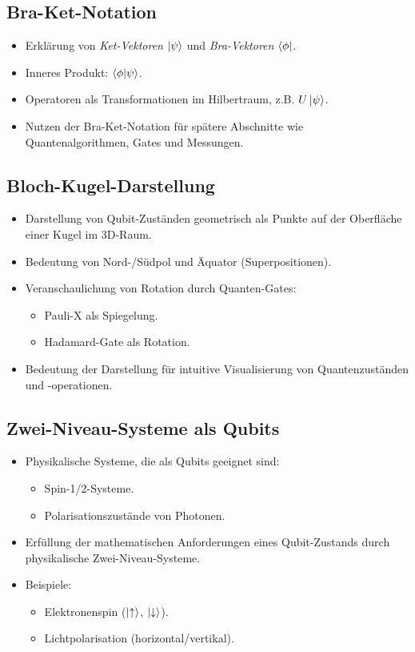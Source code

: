 \subsection{Bra-Ket-Notation}
\begin{itemize}
    \item Erklärung von \textit{Ket-Vektoren} $\ket{\psi}$ und \textit{Bra-Vektoren} $\bra{\phi}$.
    \item Inneres Produkt: $\braket{\phi | \psi}$.
    \item Operatoren als Transformationen im Hilbertraum, z.B. $U \ket{\psi}$.
    \item Nutzen der Bra-Ket-Notation für spätere Abschnitte wie Quantenalgorithmen, Gates und Messungen.
\end{itemize}

\subsection{Bloch-Kugel-Darstellung}
\begin{itemize}
    \item Darstellung von Qubit-Zuständen geometrisch als Punkte auf der Oberfläche einer Kugel im 3D-Raum.
    \item Bedeutung von Nord-/Südpol und Äquator (Superpositionen).
    \item Veranschaulichung von Rotation durch Quanten-Gates:
    \begin{itemize}
        \item Pauli-X als Spiegelung.
        \item Hadamard-Gate als Rotation.
    \end{itemize}
    \item Bedeutung der Darstellung für intuitive Visualisierung von Quantenzuständen und -operationen.
\end{itemize}

\subsection{Zwei-Niveau-Systeme als Qubits}
\begin{itemize}
    \item Physikalische Systeme, die als Qubits geeignet sind:
    \begin{itemize}
        \item Spin-1/2-Systeme.
        \item Polarisationszustände von Photonen.
    \end{itemize}
    \item Erfüllung der mathematischen Anforderungen eines Qubit-Zustands durch physikalische Zwei-Niveau-Systeme.
    \item Beispiele:
    \begin{itemize}
        \item Elektronenspin ($\ket{\uparrow}$, $\ket{\downarrow}$).
        \item Lichtpolarisation (horizontal/vertikal).
    \end{itemize}
\end{itemize}



